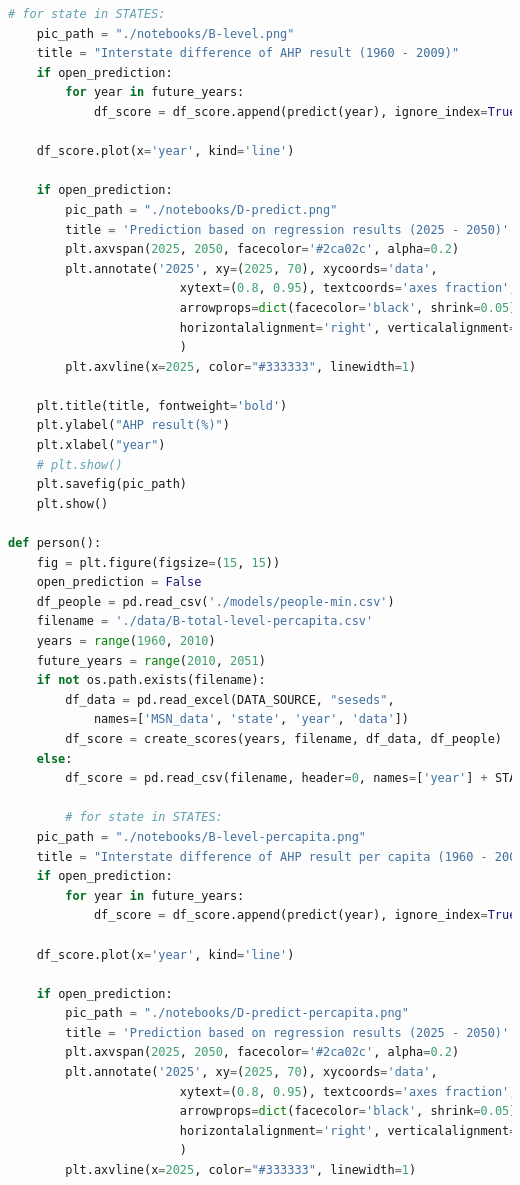 \documentclass[a4paper,11pt]{article}
\begin{document}
\begin{appendices}
\begin{lstlisting}[language=Python, caption=score.py]
        # for state in STATES:
    pic_path = "./notebooks/B-level.png"
    title = "Interstate difference of AHP result (1960 - 2009)"
    if open_prediction:
        for year in future_years:
            df_score = df_score.append(predict(year), ignore_index=True)

    df_score.plot(x='year', kind='line')

    if open_prediction:
        pic_path = "./notebooks/D-predict.png"
        title = 'Prediction based on regression results (2025 - 2050)'
        plt.axvspan(2025, 2050, facecolor='#2ca02c', alpha=0.2)
        plt.annotate('2025', xy=(2025, 70), xycoords='data',
                        xytext=(0.8, 0.95), textcoords='axes fraction',
                        arrowprops=dict(facecolor='black', shrink=0.05),
                        horizontalalignment='right', verticalalignment='top',
                        )
        plt.axvline(x=2025, color="#333333", linewidth=1)

    plt.title(title, fontweight='bold')
    plt.ylabel("AHP result(%)")
    plt.xlabel("year")
    # plt.show()
    plt.savefig(pic_path)
    plt.show()

def person():
    fig = plt.figure(figsize=(15, 15))
    open_prediction = False
    df_people = pd.read_csv('./models/people-min.csv')
    filename = './data/B-total-level-percapita.csv'
    years = range(1960, 2010)
    future_years = range(2010, 2051)
    if not os.path.exists(filename):
        df_data = pd.read_excel(DATA_SOURCE, "seseds", 
            names=['MSN_data', 'state', 'year', 'data'])
        df_score = create_scores(years, filename, df_data, df_people)
    else:
        df_score = pd.read_csv(filename, header=0, names=['year'] + STATES)

        # for state in STATES:
    pic_path = "./notebooks/B-level-percapita.png"
    title = "Interstate difference of AHP result per capita (1960 - 2009)"
    if open_prediction:
        for year in future_years:
            df_score = df_score.append(predict(year), ignore_index=True)

    df_score.plot(x='year', kind='line')

    if open_prediction:
        pic_path = "./notebooks/D-predict-percapita.png"
        title = 'Prediction based on regression results (2025 - 2050)'
        plt.axvspan(2025, 2050, facecolor='#2ca02c', alpha=0.2)
        plt.annotate('2025', xy=(2025, 70), xycoords='data',
                        xytext=(0.8, 0.95), textcoords='axes fraction',
                        arrowprops=dict(facecolor='black', shrink=0.05),
                        horizontalalignment='right', verticalalignment='top',
                        )
        plt.axvline(x=2025, color="#333333", linewidth=1)


\end{lstlisting}
\end{appendices}
\end{document}
